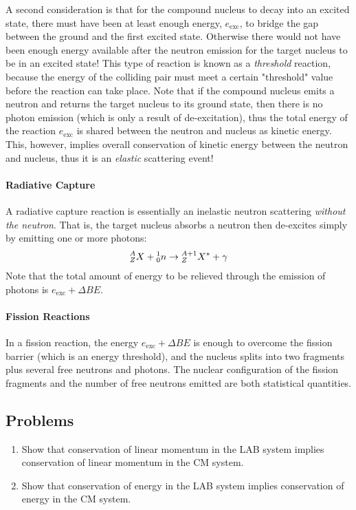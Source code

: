 \documentclass[11pt]{article}
\newcommand\leftidx[3]{{\vphantom{#2}}#1#2#3}
\begin{document}
A second consideration is that for the compound nucleus to decay into an excited state, there must have been at least enough energy, \(e_\text{exc}\), to bridge the gap between the ground and the first excited state.  Otherwise there would not have been enough energy available after the neutron emission for the target nucleus to be in an excited state!  This type of reaction is known as a \emph{threshold} reaction, because the energy of the colliding pair must meet a certain "threshold" value before the reaction can take place.  Note that if the compound nucleus emits a neutron and returns the target nucleus to its ground state, then there is no photon emission (which is only a result of de-excitation), thus the total energy of the reaction \(e_\text{exc}\) is shared between the neutron and nucleus as kinetic energy.  This, however, implies overall conservation of kinetic energy between the neutron and nucleus, thus it is an \emph{elastic} scattering event!

\paragraph{Radiative Capture}
\label{sec:orgheadline5}
A radiative capture reaction is essentially an inelastic neutron scattering \emph{without the neutron}.  That is, the target nucleus absorbs a neutron then de-excites simply by emitting one or more photons:
\begin{align*}
  \leftidx{^A_Z}{X}{} + \leftidx{^1_0}{n}{} 
  \rightarrow \leftidx{^{A+1}_Z}{X}{^*} + \gamma
\end{align*}
Note that the total amount of energy to be relieved through the emission of photons is \(e_{\text{exc}} + \Delta BE\).

\paragraph{Fission Reactions}
\label{sec:orgheadline6}
In a fission reaction, the energy \(e_{\text{exc}} + \Delta BE\) is enough to overcome the fission barrier (which is an energy threshold), and the nucleus splits into two fragments plus several free neutrons and photons.  The nuclear configuration of the fission fragments and the number of free neutrons emitted are both statistical quantities.  
\subsection{Problems}
\label{sec:orgheadline9}
\begin{enumerate}
\item Show that conservation of linear momentum in the LAB system implies conservation of linear momentum in the CM system.
\item Show that conservation of energy in the LAB system implies conservation of energy in the CM system.
\end{enumerate}
\end{document}
